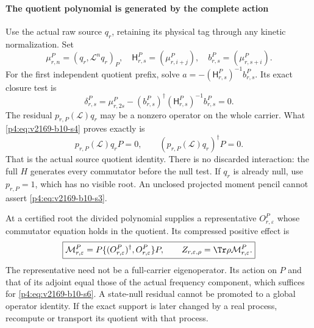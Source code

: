 \documentclass[12pt,a4paper]{article}
\begin{document}
\paragraph{The quotient polynomial is generated by the complete action}
Use the actual raw source $q_r$, retaining its physical tag through any
kinetic normalization. Set
\[
 \mu^P_{r,n}=(q_r,\mathcal L^nq_r)_P,
 \quad \mathsf H^P_{r,s}=(\mu^P_{r,i+j}),
 \quad b^P_{r,s}=(\mu^P_{r,s+i}).
\]
For the first independent quotient prefix, solve
$a=-(\mathsf H^P_{r,s})^{-1}b^P_{r,s}$. Its exact closure test is
\begin{equation}
 \boxed{\delta^P_{r,s}=\mu^P_{r,2s}
       -(b^P_{r,s})^\dagger(\mathsf H^P_{r,s})^{-1}b^P_{r,s}=0.}
 \label{p4:eq:v2169-b10-s4}
\end{equation}
The residual $p_{r,P}(\mathcal L)q_r$ may be a nonzero operator on the
whole carrier. What \eqref{p4:eq:v2169-b10-s4} proves exactly is
\begin{equation}
 p_{r,P}(\mathcal L)q_rP=0,\qquad
 (p_{r,P}(\mathcal L)q_r)^\dagger P=0.
 \label{p4:eq:v2169-b10-s5}
\end{equation}
That is the actual source quotient identity. There is no discarded
interaction: the full $H$ generates every commutator before the null test.
If $q_r$ is already null, use $p_{r,P}=1$, which has no visible root.
An unclosed projected moment pencil cannot assert \eqref{p4:eq:v2169-b10-s3}.

At a certified root the divided polynomial supplies a representative
$O^P_{r,\varepsilon}$ whose commutator equation holds in the quotient.
Its compressed positive effect is
\begin{equation}
 \boxed{\mathcal M^P_{r,\varepsilon}
     =P\{(O^P_{r,\varepsilon})^\dagger,O^P_{r,\varepsilon}\}P,\qquad
 Z_{r,\varepsilon,\rho}=\Tr\rho\mathcal M^P_{r,\varepsilon}.}
 \label{p4:eq:v2169-b10-s6}
\end{equation}
The representative need not be a full-carrier eigenoperator. Its action on
$P$ and that of its adjoint equal those of the actual frequency component,
which suffices for \eqref{p4:eq:v2169-b10-s6}. A state-null residual cannot be promoted to a
global operator identity. If the exact support is later changed by a real
process, recompute or transport its quotient with that process.
\end{document}
